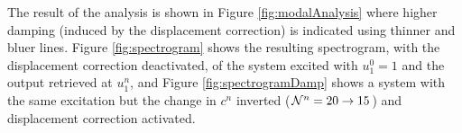 The result of the analysis is shown in Figure \ref{fig:modalAnalysis} where higher damping (induced by the displacement correction) is indicated using thinner and bluer lines. Figure \ref{fig:spectrogram} shows the resulting spectrogram, with the displacement correction deactivated, of the system excited with $u_1^0 = 1$ and the output retrieved at $u_1^n$, and Figure \ref{fig:spectrogramDamp} shows a system with the same excitation but the change in $c^n$ inverted ($\mathcal{N}^n=20\rightarrow 15$) and displacement correction activated.

\begin{figure}[t!]
    \centering
    \\
    \vspace{-1em}\\
    \vspace{-1em}

\end{figure}
